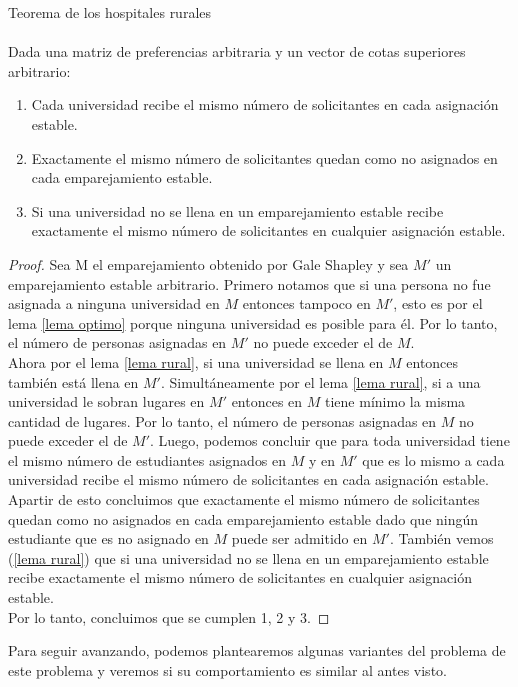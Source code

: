 \begin{teo}{Teorema de los hospitales rurales \\ }
\label{rural}
\cite{GaleSotomayor}\\
Dada una matriz de preferencias arbitraria y un vector de cotas superiores arbitrario:
\begin{enumerate}
\item Cada universidad recibe el mismo número de solicitantes en cada asignación estable.
\item Exactamente el mismo número de solicitantes quedan como no asignados en cada emparejamiento estable. 
\item Si una universidad no se llena en un emparejamiento estable recibe exactamente el mismo número de solicitantes en cualquier asignación estable. 
\end{enumerate}
\end{teo}
\begin{proof}
Sea M el emparejamiento obtenido por Gale Shapley y sea $M'$ un emparejamiento estable arbitrario. Primero notamos que si una persona no fue asignada a ninguna universidad en $M$ entonces tampoco en $M'$, esto es por el lema \ref{lema optimo} porque ninguna universidad es posible para él. Por lo tanto, el número de personas asignadas en $M'$ no puede exceder el de $M$. \\
Ahora por el lema \ref{lema rural}, si una universidad se llena en $M$ entonces también está llena en $M'$. Simultáneamente por el lema \ref{lema rural}, si a una universidad le sobran lugares en $M'$ entonces en $M$ tiene mínimo la misma cantidad de lugares. Por lo tanto, el número de personas asignadas en $M$ no puede exceder el de $M'$. Luego, podemos concluir que para toda universidad tiene el mismo número de estudiantes asignados en $M$ y en $M'$ que es lo mismo a cada universidad recibe el mismo número de solicitantes en cada asignación estable. \\
Apartir de esto concluimos que exactamente el mismo número de solicitantes quedan como no asignados en cada emparejamiento estable dado que ningún estudiante que es no asignado en $M$ puede ser admitido en $M'$. También vemos (\ref{lema rural}) que si una universidad no se llena en un emparejamiento estable recibe exactamente el mismo número de solicitantes en cualquier asignación estable. \\
Por lo tanto, concluimos que se cumplen 1, 2 y 3.
\end{proof}

Para seguir avanzando, podemos plantearemos algunas variantes del problema de este problema y veremos si su comportamiento es similar al antes visto. 
